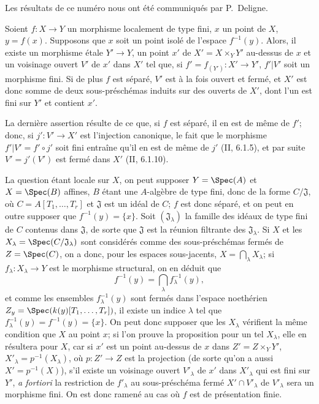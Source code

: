 Les résultats de ce numéro nous ont été communiqués par P.~Deligne.

\begin{theorem}[18.12.1]
\label{IV.18.12.1}
Soient $f:X\to Y$ un morphisme localement de type fini, $x$ un point de $X$, $y=f(x)$. Supposons que $x$ soit un point isolé de l'espace $f^{-1}(y)$. Alors, il existe un morphisme étale $Y'\to Y$, un point $x'$ de $X'=X\times_Y Y'$ au-dessus de $x$ et un voisinage ouvert $V'$ de $x'$ dans $X'$ tel que, si $f'=f_{(Y')}:X'\to Y'$, $f'|V'$ soit un morphisme fini. Si de plus $f$ est séparé, $V'$ est à la fois ouvert et fermé, et $X'$ est donc somme de deux sous-préschémas induits sur des ouverts de $X'$, dont l'un est fini sur $Y'$ et contient $x'$.
\end{theorem}

La dernière assertion résulte de ce que, si $f$ est séparé, il en est de même de $f'$; donc, si $j':V'\to X'$ est l'injection canonique, le fait que le morphisme $f'|V'=f'\circ j'$ soit fini entraîne qu'il en est de même de $j'$ (II, 6.1.5), et par suite $V'=j'(V')$ est fermé dans $X'$ (II, 6.1.10).

La question étant locale sur $X$, on peut supposer $Y=\Spec(A)$ et $X=\Spec(B)$ affines, $B$ étant une $A$-algèbre de type fini, donc de la forme $C/\mathfrak J$, où $C=A[T_1,\ldots,T_r]$ et $\mathfrak J$ est un idéal de $C$; $f$ est donc séparé, et on peut en outre supposer que $f^{-1}(y)=\{x\}$. Soit $(\mathfrak J_\lambda)$ la famille des idéaux de type fini de $C$ contenus dans $\mathfrak J$, de sorte que $\mathfrak J$ est la réunion filtrante des $\mathfrak J_\lambda$. Si $X$ et les $X_\lambda=\Spec(C/\mathfrak J_\lambda)$ sont considérés comme des sous-préschémas fermés de $Z=\Spec(C)$, on a donc, pour les espaces sous-jacents, $X=\bigcap_\lambda X_\lambda$; si $f_\lambda:X_\lambda\to Y$ est le morphisme structural, on en déduit que
\[
  f^{-1}(y)=\bigcap_\lambda f_\lambda^{-1}(y),
\]
et comme les ensembles $f_\lambda^{-1}(y)$ sont fermés dans l'espace noethérien $Z_y=\Spec(k(y)[T_1,\ldots,T_r])$, il existe un indice $\lambda$ tel que $f_\lambda^{-1}(y)=f^{-1}(y)=\{x\}$. On peut donc supposer que les $X_\lambda$ vérifient la même condition que $X$ au point $x$; si l'on prouve la proposition pour un tel $X_\lambda$, elle en résultera pour $X$, car si $x'$ est un point au-dessus de $x$ dans $Z'=Z\times_Y Y'$, $X'_\lambda=p^{-1}(X_\lambda)$, où $p:Z'\to Z$ est la projection (de sorte qu'on a aussi $X'=p^{-1}(X)$), s'il existe un voisinage ouvert $V'_\lambda$ de $x'$ dans $X'_\lambda$ qui est fini sur $Y'$, \emph{a fortiori} la restriction de $f'_\lambda$ au sous-préschéma fermé $X'\cap V'_\lambda$ de $V'_\lambda$ sera un morphisme fini. On est donc ramené au cas où $f$ est de présentation finie.

